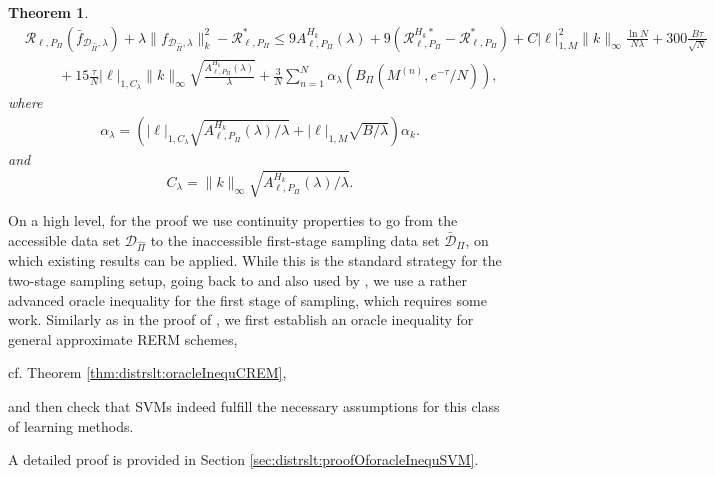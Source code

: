 \documentclass[letterpaper]{article} %
\newcommand{\dataSet}{\mathcal{D}}
\newcommand{\dataSetBar}{\bar{\dataSet}}
\newcommand{\risk}{\mathcal{R}} %
\newcommand{\Risk}[2]{\risk_{{#1},{#2}}} %
\newcommand{\RiskBayes}[2]{\risk_{{#1},{#2}}^\ast} %
\newcommand{\LocLip}[2]{|#1|_{1,{#2}}} %
\newcommand{\hilbertianEmbed}{\Pi} %
\newcommand{\ApproxErrorFunc}[3]{A^{#3}_{#1,#2}}
\newcommand{\Aef}{\ApproxErrorFunc{\ell}{P_\hilbertianEmbed}{H_k}}
\newcommand{\hilbertianEmbedBound}{B_\hilbertianEmbed} %
\newcommand{\clipped}[1]{\bar{#1}}
\newtheorem{theorem}{Theorem}
\newif\ifCameraReady
\begin{document}
\begin{theorem}
\begin{align}
        & \Risk{\ell}{P_\hilbertianEmbed}(\clipped{f}_{\dataSet_{\hat\hilbertianEmbed},\lambda})
        + \lambda \|f_{\dataSet_{\hat\hilbertianEmbed},\lambda}\|_k^2 - \RiskBayes{\ell}{P_\hilbertianEmbed}
    \leq
        9 \Aef(\lambda) + 9(\Risk{\ell}{P_{\hilbertianEmbed}}^{H_k\ast} - \RiskBayes{\ell}{P_\hilbertianEmbed}) 
        + C \LocLip{\ell}{M}^2\|k\|_\infty \frac{\ln N}{N\lambda} + 300 \frac{B\tau}{\sqrt{N}} \\ \nonumber
    & \hspace{1cm} + 15\frac{\tau}{N}\LocLip{\ell}{C_\lambda}\|k\|_\infty\sqrt{\frac{\Aef(\lambda)}{\lambda}} 
        + \frac{3}{N}\sum_{n=1}^N \alpha_\lambda\left(\hilbertianEmbedBound(M^{(n)},e^{-\tau}/N)\right),
\end{align}
\fi
where
\begin{align*}
    \alpha_\lambda = \left(
        \LocLip{\ell}{C_\lambda}\sqrt{\Aef(\lambda)/\lambda}
        + \LocLip{\ell}{M}\sqrt{B/\lambda}
        \right)\alpha_k.
\end{align*}
and
\begin{equation*}
    C_\lambda = \|k\|_\infty\sqrt{\Aef(\lambda)/\lambda}.
\end{equation*}
\end{theorem}
On a high level, for the proof we use continuity properties to go from the accessible data set $\dataSet_{\hat\hilbertianEmbed}$ to the inaccessible first-stage sampling data set $\dataSetBar_\hilbertianEmbed$, on which existing results can be applied.
While this is the standard strategy for the two-stage sampling setup, going back to \cite{szabo2015two,lopezpaz2015towards} and also used by \cite{fiedler2024statistical}, we use a rather advanced oracle inequality for the first stage of sampling, which requires some work.
Similarly as in the proof of \cite[Theorem~7.22]{SC08},
we first establish an oracle inequality for general approximate RERM schemes, 
\ifCameraReady
\else
cf. Theorem \ref{thm:distrslt:oracleInequCREM},
\fi
and then check that SVMs indeed fulfill the necessary assumptions for this class of learning methods.
\ifCameraReady
A detailed proof is provided in the supplementary material.
\else
A detailed proof is provided in Section \ref{sec:distrslt:proofOforacleInequSVM}.
\fi
\end{document}
